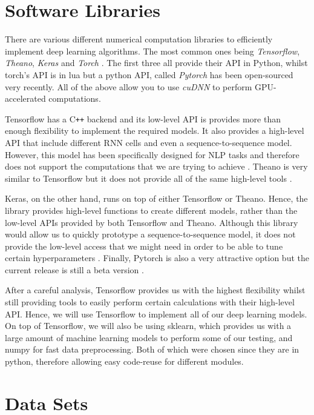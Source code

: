 \newpage

\section{Software Libraries}

There are various different numerical computation libraries to efficiently implement deep learning algorithms.
The most common ones being \textit{Tensorflow}, \textit{Theano}, \textit{Keras} and \textit{Torch} \cite{tensorflow,theano,keras,torch}.
The first three all provide their API in Python, whilst torch's API is in lua but a python API, called \textit{Pytorch} has been open-sourced very recently.
All of the above allow you to use \textit{cuDNN} to perform GPU-accelerated computations.

Tensorflow has a C\texttt{++} backend and its low-level API is provides more than enough flexibility to implement the required models.
It also provides a high-level API that include different RNN cells and even a sequence-to-sequence model.
However, this model has been specifically designed for NLP tasks and therefore does not support the computations that we are trying to achieve \cite{tensorflow}.
Theano is very similar to Tensorflow but it does not provide all of the same high-level tools \cite{theano}.

Keras, on the other hand, runs on top of either Tensorflow or Theano.
Hence, the library provides high-level functions to create different models, rather than the low-level APIs provided by both Tensorflow and Theano.
Although this library would allow us to quickly prototype a sequence-to-sequence model, it does not provide the low-level access that we might need in order to be able to tune certain hyperparameters \cite{keras}.
Finally, Pytorch is also a very attractive option but the current release is still a beta version \cite{torch}.

After a careful analysis, Tensorflow provides us with the highest flexibility whilst still providing tools to easily perform certain calculations with their high-level API.
Hence, we will use Tensorflow to implement all of our deep learning models.
On top of Tensorflow, we will also be using sklearn, which provides us with a large amount of machine learning models to perform some of our testing, and numpy for fast data preprocessing.
Both of which were chosen since they are in python, therefore allowing easy code-reuse for different modules.

\section{Data Sets}

